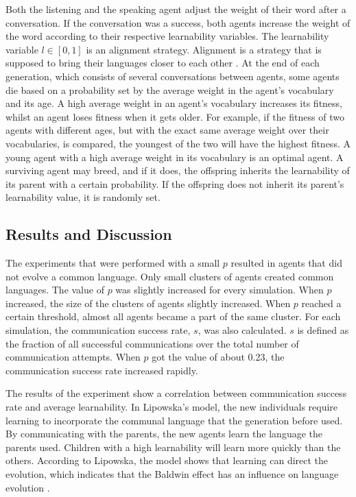 Both the listening and the speaking agent adjust the weight of their word after a conversation. If the conversation was a success, both agents increase the weight of the word according to their respective learnability variables. The learnability variable $ l \in [0, 1]$ is an alignment strategy. Alignment is a strategy that is supposed to bring their languages closer to each other \citep{steels2012experiments}. At the end of each generation, which consists of several conversations between agents, some agents die based on a probability set by the average weight in the agent's vocabulary and its age. A high average weight in an agent's vocabulary increases its fitness, whilst an agent loses fitness when it gets older. For example, if the fitness of two agents with different ages, but with the exact same average weight over their vocabularies, is compared, the youngest of the two will have the highest fitness. A young agent with a high average weight in its vocabulary is an optimal agent. A surviving agent may breed, and if it does, the offspring inherits the learnability of its parent with a certain probability. If the offspring does not inherit its parent's learnability value, it is randomly set.

\subsection{Results and Discussion}
The experiments that were performed with a small $p$ resulted in agents that did not evolve a common language. Only small clusters of agents created common languages. The value of $p$ was slightly increased for every simulation. When $p$ increased, the size of the clusters of agents slightly increased. When $p$ reached a certain threshold, almost all agents became a part of the same cluster. For each simulation, the communication success rate, $s$, was also calculated. $s$ is defined as the fraction of all successful communications over the total number of communication attempts. When $p$ got the value of about 0.23, the communication success rate increased rapidly. 

The results of the experiment show a correlation between communication success rate and average learnability. In Lipowska's model, the new individuals require learning to incorporate the communal language that the generation before used. By communicating with the parents, the new agents learn the language the parents used. Children with a high learnability will learn more quickly than the others. According to Lipowska, the model shows that learning can direct the evolution, which indicates that the Baldwin effect has an influence on language evolution \citep[Section 4]{lipowska2011naming}.

